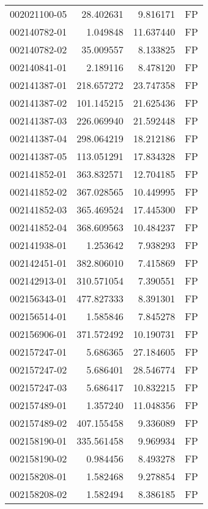 \begin{tabular}{lrrl}
002021100-05 &   28.402631 &       9.816171 &   FP \\
002140782-01 &    1.049848 &      11.637440 &   FP \\
002140782-02 &   35.009557 &       8.133825 &   FP \\
002140841-01 &    2.189116 &       8.478120 &   FP \\
002141387-01 &  218.657272 &      23.747358 &   FP \\
002141387-02 &  101.145215 &      21.625436 &   FP \\
002141387-03 &  226.069940 &      21.592448 &   FP \\
002141387-04 &  298.064219 &      18.212186 &   FP \\
002141387-05 &  113.051291 &      17.834328 &   FP \\
002141852-01 &  363.832571 &      12.704185 &   FP \\
002141852-02 &  367.028565 &      10.449995 &   FP \\
002141852-03 &  365.469524 &      17.445300 &   FP \\
002141852-04 &  368.609563 &      10.484237 &   FP \\
002141938-01 &    1.253642 &       7.938293 &   FP \\
002142451-01 &  382.806010 &       7.415869 &   FP \\
002142913-01 &  310.571054 &       7.390551 &   FP \\
002156343-01 &  477.827333 &       8.391301 &   FP \\
002156514-01 &    1.585846 &       7.845278 &   FP \\
002156906-01 &  371.572492 &      10.190731 &   FP \\
002157247-01 &    5.686365 &      27.184605 &   FP \\
002157247-02 &    5.686401 &      28.546774 &   FP \\
002157247-03 &    5.686417 &      10.832215 &   FP \\
002157489-01 &    1.357240 &      11.048356 &   FP \\
002157489-02 &  407.155458 &       9.336089 &   FP \\
002158190-01 &  335.561458 &       9.969934 &   FP \\
002158190-02 &    0.984456 &       8.493278 &   FP \\
002158208-01 &    1.582468 &       9.278854 &   FP \\
002158208-02 &    1.582494 &       8.386185 &   FP \\

\end{tabular}
